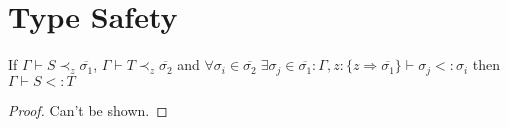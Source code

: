 \documentclass{llncs}
\begin{document}



\section{Type Safety}

\begin{lemma}\label{lem:sub}
If $\Gamma \vdash S \prec_z \overline{\sigma_1}$,
	$\Gamma \vdash T \prec_z \overline{\sigma_2}$ and
	$\forall \sigma_i \in \overline{\sigma_2} \;
	 \exists \sigma_j \in \overline{\sigma_1}:
	 \Gamma, z : \{z \Rightarrow \overline{\sigma_1}\} 
	 \vdash \sigma_j <: \sigma_i$ then
	$\Gamma \vdash S <: T$
\end{lemma}
\begin{proof}
Can't be shown.
\end{proof}

\end{document}
